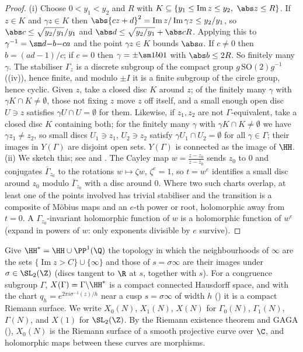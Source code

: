 \begin{proof}
(i) Choose $0<y_1<y_2$ and $R$ with $K\subseteq\{y_1\le\operatorname{Im}z\le y_2,\ \abs z\le R\}$. If $z\in K$ and $\gamma z\in K$ then
$\abs{cz+d}^2=\operatorname{Im}z/\operatorname{Im}\gamma z\le y_2/y_1$, so $\abs c\le\sqrt{y_2/y_1}/y_1$ and $\abs d\le\sqrt{y_2/y_1}+\abs cR$. Applying this to $\gamma^{-1}=\sm d{-b}{-c}a$
and the point $\gamma z\in K$ bounds $\abs a$. If $c\ne0$ then $b=(ad-1)/c$; if $c=0$ then $\gamma=\pm\sm1b01$ with $\abs b\le2R$. So finitely many $\gamma$. The
stabiliser $\Gamma_z$ is a discrete subgroup of the compact group $g\,\mathrm{SO}(2)g^{-1}$ ((iv)), hence finite, and modulo $\pm I$ it is a
finite subgroup of the circle group, hence cyclic. Given $z$, take a closed disc $K$ around $z$; of the finitely many $\gamma$ with $\gamma K\cap K\ne\emptyset$, those not
fixing $z$ move $z$ off itself, and a small enough open disc $U\ni z$ satisfies $\gamma U\cap U=\emptyset$ for them. Likewise, if $z_1,z_2$ are not $\Gamma$-equivalent,
take a closed disc $K$ containing both; for the finitely many $\gamma$ with $\gamma K\cap K\ne\emptyset$ we have $\gamma z_1\ne z_2$, so small discs $U_1\ni z_1$, $U_2\ni z_2$
satisfy $\gamma U_1\cap U_2=\emptyset$ for all $\gamma\in\Gamma$; their images in $Y(\Gamma)$ are disjoint open sets. $Y(\Gamma)$ is connected as the image of $\HH$.
(ii) We sketch this; see \cite[Sections 2.1, 2.2]{DiamondShurman} and \cite[Section 1.5]{Shimura71}. The Cayley map $w=\frac{z-z_0}{z-\bar z_0}$ sends $z_0$ to $0$ and
conjugates $\bar\Gamma_{z_0}$ to the rotations $w\mapsto\zeta w$, $\zeta^e=1$, so $t=w^e$ identifies a small disc around $z_0$ modulo $\bar\Gamma_{z_0}$ with a disc around $0$.
Where two such charts overlap, at least one of the points involved has trivial stabiliser and the transition is a composite of M\"obius maps and an
$e$-th power or root, holomorphic away from $t=0$. A $\Gamma_{z_0}$-invariant holomorphic function of $w$ is a holomorphic function of $w^e$ (expand in powers of $w$:
only exponents divisible by $e$ survive).
\end{proof}

\begin{theorem}\label{thm:modforms:x0-compact}
Give $\HH^*=\HH\cup\PP^1(\Q)$ the topology in which the neighbourhoods of $\infty$ are the sets $\{\operatorname{Im}z>C\}\cup\{\infty\}$ and those of $s=\sigma\infty$ are their images
under $\sigma\in\SL_2(\Z)$ (discs tangent to $\R$ at $s$, together with $s$). For a congruence subgroup $\Gamma$, $X(\Gamma)=\Gamma\backslash\HH^*$ is a compact connected Hausdorff
space, and with the chart $q_h=e^{2\pi i\sigma^{-1}(z)/h}$ near a cusp $s=\sigma\infty$ of width $h$ () it is a compact Riemann surface. We write
$X_0(N)$, $X_1(N)$, $X(N)$ for $\Gamma_0(N)$, $\Gamma_1(N)$, $\Gamma(N)$, and $X(1)$ for $\SL_2(\Z)$. By the Riemann existence theorem and GAGA (), $X_0(N)$ is
the Riemann surface of a smooth projective curve over $\C$, and holomorphic maps between these curves are morphisms.
\end{theorem}

